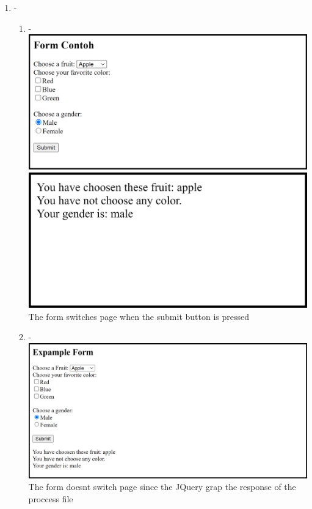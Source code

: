 \documentclass[12pt,titlepage]{article}
\begin{document}
\begin{enumerate}
    \item -   
    \begin{enumerate}
        \item - \\ 
        \includegraphics[width=.85\textwidth]{images/figures/fig6.1_a.png} \\ 
        \includegraphics[width=.85\textwidth]{images/figures/fig6.1_b.png} \\ 
        The form switches page when the submit button is pressed

        \newpage

        \item - \\ \includegraphics[width=.85\textwidth]{images/figures/fig6.2.png} \\ The form doesnt switch page since the JQuery grap the response of the proccess file
    \end{enumerate}
\end{enumerate}
\end{document}
